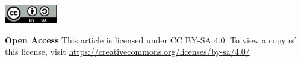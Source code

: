 \vspace{8mm}
\noindent
\includegraphics[height=8mm]{licenses/by-sa}

\begin{spacing}{.6}
\noindent
\textbf{Open Access} This article is licensed under CC BY-SA 4.0. To view a copy of this license, visit \url{https://creativecommons.org/licenses/by-sa/4.0/}
\end{spacing}